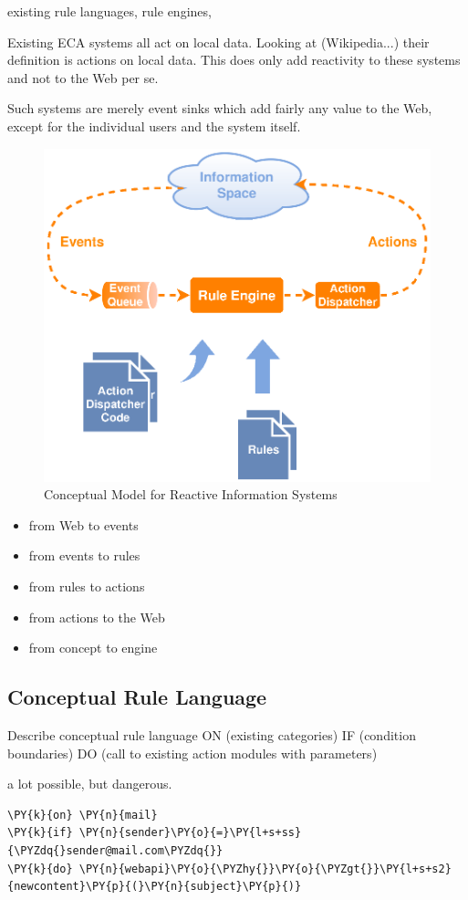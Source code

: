 existing rule languages, rule engines, 

Existing ECA systems all act on local data.
Looking at (Wikipedia...) their definition is actions on local data.
This does only add reactivity to these systems and not to the Web per se.

Such systems are merely event sinks which add fairly any value to the Web, except for the individual users and the system itself.

\begin{figure}[!ht]
  \centering
  \includegraphics{figures/Standard-Model-Template}
  \caption{Conceptual Model for Reactive Information Systems}
  \label{fig:Standard-Model-Template}
\end{figure}


\begin{itemize}
  \item from Web to events
  \item from events to rules
  \item from rules to actions
  \item from actions to the Web
  \item from concept to engine
\end{itemize}


\subsection{Conceptual Rule Language}
Describe conceptual rule language
ON (existing categories)
IF (condition boundaries)
DO (call to existing action modules with parameters)

a lot possible, but dangerous.

\begin{Verbatim}[fontsize=\small,commandchars=\\\{\}]
\PY{k}{on} \PY{n}{mail}
\PY{k}{if} \PY{n}{sender}\PY{o}{=}\PY{l+s+ss}{\PYZdq{}sender@mail.com\PYZdq{}}
\PY{k}{do} \PY{n}{webapi}\PY{o}{\PYZhy{}}\PY{o}{\PYZgt{}}\PY{l+s+s2}{newcontent}\PY{p}{(}\PY{n}{subject}\PY{p}{)}
\end{Verbatim}
